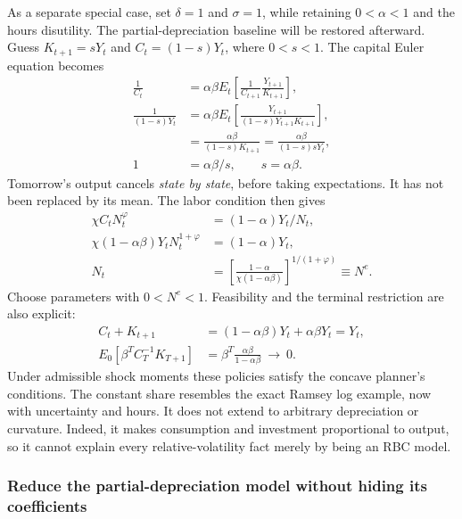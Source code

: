 As a separate special case, set $\delta=1$ and $\sigma=1$, while retaining
$0<\alpha<1$ and the hours disutility. The partial-depreciation baseline will
be restored afterward. Guess $K_{t+1}=sY_t$ and $C_t=(1-s)Y_t$, where $0<s<1$.
The capital Euler equation becomes
\begin{align}
\frac{1}{C_t}&=\alpha\beta E_t\!\left[
 \frac{1}{C_{t+1}}\frac{Y_{t+1}}{K_{t+1}}\right],\\
\frac{1}{(1-s)Y_t}
 &=\alpha\beta E_t\!\left[
 \frac{Y_{t+1}}{(1-s)Y_{t+1}K_{t+1}}\right],\\
&=\frac{\alpha\beta}{(1-s)K_{t+1}}
 =\frac{\alpha\beta}{(1-s)sY_t},\\
1&=\alpha\beta/s,\qquad s=\alpha\beta.
\end{align}
Tomorrow's output cancels \emph{state by state}, before taking expectations.
It has not been replaced by its mean. The labor condition then gives
\begin{align}
\chi C_tN_t^\varphi&=(1-\alpha)Y_t/N_t,\\
\chi(1-\alpha\beta)Y_tN_t^{1+\varphi}&=(1-\alpha)Y_t,\\
N_t&=\left[\frac{1-\alpha}{\chi(1-\alpha\beta)}
     \right]^{1/(1+\varphi)}\equiv N^e.
\end{align}
Choose parameters with $0<N^e<1$. Feasibility and the terminal restriction are
also explicit:
\begin{align}
C_t+K_{t+1}&=(1-\alpha\beta)Y_t+\alpha\beta Y_t=Y_t,\\
E_0[\beta^T C_T^{-1}K_{T+1}]
 &=\beta^T\frac{\alpha\beta}{1-\alpha\beta}\ \longrightarrow\ 0.
\end{align}
Under admissible shock moments these policies satisfy the concave planner's
conditions. The constant share resembles the exact Ramsey log example, now
with uncertainty and hours. It does not extend to arbitrary depreciation or
curvature. Indeed, it makes consumption and investment proportional to output,
so it cannot explain every relative-volatility fact merely by being an RBC model.

\subsubsection{Reduce the partial-depreciation model without hiding its coefficients}

